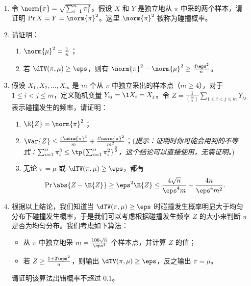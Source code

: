 \begin{problem}
\begin{enumerate}
    \item 令 $\norm{\pi} = \sqrt{\sum_{i=1}^n \pi_i^2}$。假设 $X$ 和 $Y$ 是独立地从 $\pi$ 中采的两个样本，请证明 $\Pr{X = Y} = \norm{\pi}^2$。这里 $\norm{\pi}^2$ 被称为碰撞概率。
    \item 请证明：
    \begin{enumerate}
        \item $\norm{\mu}^2 = \frac{1}{n}$；
        \item 若 $\dTV(\pi, \mu) \ge \eps$，则有 $\norm{\pi}^2 - \norm{\mu}^2 \ge \frac{4\eps^2}{n}$。
    \end{enumerate}
    \item 假设 $X_1, X_2, \dots, X_m$ 是 $m$ 个从 $\pi$ 中独立采出的样本点（$m \ge 4$），对于 $1 \le i < j \le m$，定义随机变量 $Y_{ij} = \1{X_i = X_j}$。令 $Z = \frac{1}{\binom{m}{2}} \sum_{1 \le i < j \le m} Y_{ij}$ 表示碰撞发生的频率，请证明：
    \begin{enumerate}
        \item $\E{Z} = \norm{\pi}^2$；
        \item $\Var{Z} \le \frac{4\norm{\pi}^3}{m} + \frac{4\norm{\pi}^2}{m^2}$；(\textit{提示：证明时你可能会用到的不等式：$\sum_{i=1}^n \pi_i^3 \leq \tp{\sum_{i=1}^n \pi_i^2}^{\frac{3}{2}}$，这个结论可以直接使用，无需证明。})
        \item 无论 $\pi = \mu$ 或 $\dTV(\pi, \mu) \ge \eps$，都有
        \[
            \Pr{\abs{Z - \E{Z}} \ge \eps^2 \E{Z}} \le \frac{4\sqrt{n}}{\eps^4 m} + \frac{4n}{\eps^4 m^2}.
        \]
    \end{enumerate}
    \item 根据以上结论，我们知道当 $\dTV(\pi, \mu) \ge \eps$ 时碰撞发生概率明显大于均匀分布下碰撞发生概率，于是我们可以考虑根据碰撞发生频率 $Z$ 的大小来判断 $\pi$ 是否为均匀分布。我们考虑如下算法：
    \begin{itemize}
        \item 从 $\pi$ 中独立地采 $m = \frac{100\sqrt{n}}{\eps^4}$ 个样本点，并计算 $Z$ 的值；
        \item 若 $Z \ge \frac{1+2\eps^2}{n}$，则输出 $\dTV(\pi, \mu) \ge \eps$，反之输出 $\pi = \mu$。
    \end{itemize}
    请证明该算法出错概率不超过 $0.1$。
\end{enumerate}
\end{problem}
